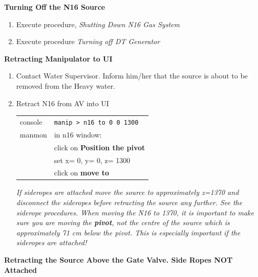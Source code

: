 \documentclass[10pt]{article}
\begin{document}
{\bf Turning Off the N16 Source}

\begin{enumerate}
\item \CheckBox[name=n16sd1]{} Execute procedure, {\it Shutting Down N16 Gas System}
\item \CheckBox[name=n16sd2]{} Execute procedure {\it Turning off DT Generator}
\end{enumerate}

{\bf Retracting Manipulator to UI}

\begin{enumerate}
\item \CheckBox[name=n16rmui1]{} Contact Water Supervisor. Inform him/her that the source is about to be removed from the Heavy water.
\item \CheckBox[name=n16rmui2]{} Retract N16 from AV into UI
	\begin{center}
	\begin{tabular}{|l|l|}
	\hline
	console & \verb+manip > n16 to 0 0 1300+ \\
	manmon & in n16 window: \\
	& click on {\bf Position the pivot}\\
	& set x= 0, y= 0, z= 1300 \\
	& click on {\bf move to} \\
	\hline
	\end{tabular}
	\end{center}
{\it If sideropes are attached move the source to approximately z=1370 and disconnect the sideropes before retracting the source any further. See the siderope procedures. When moving the N16 to 1370, it is important to make sure you are moving the {\bf pivot}, not the centre of the source which is approximately 71 cm below the pivot. This is especially important if the sideropes are attached!}
\end{enumerate}

{\bf Retracting the Source Above the Gate Valve. Side Ropes NOT Attached}
\end{document}
